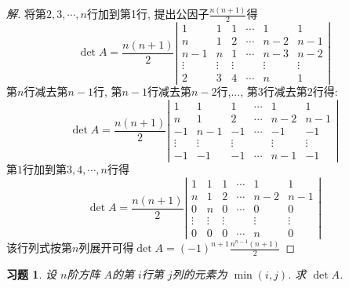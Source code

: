 \documentclass[UTF8]{ctexart}
\newtheorem{ex}[thm]{习题}
\begin{document}
\begin{proof}[解]将第$2, 3, \cdots, n$行加到第1行, 提出公因子$\frac{n(n+1)}{2}$得
$$\det A=\frac{n(n+1)}{2}\left|\begin{array}{cccccc}
                 1 & 1 & 1 & \cdots & 1 & 1 \\
                 n & 1 & 2 & \cdots & n-2 & n-1 \\
                 n-1 & n & 1 & \cdots & n-3 & n-2 \\
                 \vdots & \vdots & \vdots &  & \vdots & \vdots \\
                 2 & 3 & 4 & \cdots & n & 1
               \end{array}
\right|$$
第$n$行减去第$n-1$行, 第$n-1$行减去第$n-2$行,..., 第$3$行减去第$2$行得:
$$\det A=\frac{n(n+1)}{2}\left|\begin{array}{cccccc}
                 1 & 1 & 1 & \cdots & 1 & 1 \\
                 n & 1 & 2 & \cdots & n-2 & n-1 \\
                 -1 & n-1 & -1 & \cdots & -1 & -1 \\
                 \vdots & \vdots & \vdots &  & \vdots & \vdots \\
                 -1 & -1 & -1 & \cdots & n-1 & -1
               \end{array}
\right|$$
第$1$行加到第$3, 4, \cdots, n$行得
$$\det A=\frac{n(n+1)}{2}\left|\begin{array}{cccccc}
                 1 & 1 & 1 & \cdots & 1 & 1 \\
                 n & 1 & 2 & \cdots & n-2 & n-1 \\
                 0 & n & 0 & \cdots & 0 & 0 \\
                 \vdots & \vdots & \vdots &  & \vdots & \vdots \\
                 0 & 0 & 0 & \cdots & n & 0
               \end{array}
\right|$$
该行列式按第$n$列展开可得$\det A=(-1)^{n+1}\frac{n^{n-1}(n+1)}{2}$
\end{proof}


\begin{ex}
	设 $n$阶方阵 $A$的第 $i$行第 $j$列的元素为 $\min(i,j)$. 求 $\det A$.
\end{ex}
\end{document}
